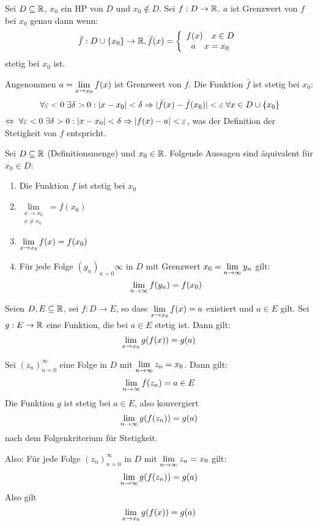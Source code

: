 \documentclass[main.tex]{subfiles}
\begin{document}
\begin{Bemerkung}
  \begin{Theorem}
    Sei $D\subseteq \mathbb{R}$, $x_0$ ein HP von $D$ und $x_0 \notin D$. Sei $f : D \to \mathbb{R}$. $a$ ist Grenzwert von $f$ bei $x_0$ genau dann wenn:
    $$\bar{f} : D \cup \{x_0\} \to \mathbb{R}, \bar{f}(x) = \left\{ \begin{array}{c}
      f(x) \quad x \in D\\
      a \quad x = x_0
    \end{array}\right.$$
    stetig bei $x_0$ ist.
  \end{Theorem}
  \begin{Beweis}
    Angenommen $a = \lim \limits_{x \to x_0} f(x)$ ist Grenzwert von $f$. Die Funktion $\bar{f}$ ist stetig bei $x_0$:
    $$\;\forall \varepsilon < 0 \;\exists \delta > 0 : |x-x_0| < \delta \Rightarrow |\bar{f}(x) - \bar{f}(x_0)| < \varepsilon \;\forall x \in D \cup \{x_0\}$$
    $\Leftrightarrow \;\forall \varepsilon < 0 \;\exists \delta > 0 : |x-x_0| < \delta \Rightarrow |f(x) - a| < \varepsilon$, was der Definition der Stetigkeit von $f$ entspricht.
  \end{Beweis}
\end{Bemerkung}

\begin{Theorem}
  Sei $D \subseteq \mathbb{R}$ (Definitionsmenge) und $x_0 \in \mathbb{R}$. Folgende Aussagen sind äquivalent für $x_0 \in D$:
  \begin{enumerate}
    \item Die Funktion $f$ ist stetig bei $x_0$
    \item $\lim \limits_{\substack{x \to x_0 \\ x \neq x_0}} = f(x_0)$
    \item $\lim \limits_{x \to x_0} f(x) = f(x_0)$
    \item Für jede Folge $(y_n)_{n=0}\infty$ in $D$ mit Grenzwert $x_0 = \lim \limits_{n \to \infty} y_n$ gilt:
      $$\lim \limits_{n \to \infty} f(y_n) = f(x_0)$$
  \end{enumerate}
\end{Theorem}

\begin{Theorem}
  Seien $D,E \subseteq \mathbb{R}$, sei $f:D\to E$, so dass $\lim \limits_{x \to x_0} f(x) = a$ existiert und $a \in E$ gilt. Sei $g: E \to \mathbb{R}$ eine Funktion, die bei $a \in E$ stetig ist. Dann gilt:
  $$\lim \limits_{x \to x_0} g(f(x)) = g(a)$$
\end{Theorem}

\begin{Beweis}
  Sei $(z_n)_{n = 0}^\infty$ eine Folge in $D$ mit $\lim \limits_{n \to \infty} z_n = x_0$. Dann gilt:
  $$\lim \limits_{n \to \infty} f(z_n) = a \in E$$
  Die Funktion $g$ ist stetig bei $a \in E$, also konvergiert
  $$\lim \limits_{n \to \infty} g(f(z_n)) = g(a)$$
  nach dem Folgenkriterium für Stetigkeit.

  Also: Für jede Folge $(z_n)_{n = 0}^\infty$ in $D$ mit $\lim \limits_{n \to \infty} z_n = x_0$ gilt:
  $$\lim \limits_{n \to \infty} g(f(z_n)) = g(a)$$
  Also gilt
  $$\lim \limits_{x \to x_0} g(f(x)) = g(a)$$
\end{Beweis}
\end{document}
